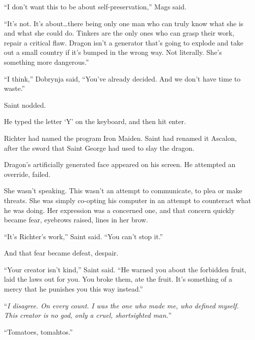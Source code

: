 ``I don't want this to be about self-preservation,'' Mags said.



``It's not.  It's about\ldots there being only one man who can truly know what she is and what she could do.  Tinkers are the only ones who can grasp their work, repair a critical flaw.  Dragon isn't a generator that's going to explode and take out a small country if it's bumped in the wrong way.  Not literally.  She's something more dangerous.''



``I think,'' Dobrynja said, ``You've already decided.  And we don't have time to waste.''



Saint nodded.



He typed the letter `Y' on the keyboard, and then hit enter.



Richter had named the program Iron Maiden.  Saint had renamed it Ascalon, after the sword that Saint George had used to slay the dragon.



Dragon's artificially generated face appeared on his screen.  He attempted an override, failed.



She wasn't speaking.  This wasn't an attempt to communicate, to plea or make threats.  She was simply co-opting his computer in an attempt to counteract what he was doing.  Her expression was a concerned one, and that concern quickly became fear, eyebrows raised, lines in her brow.



``It's Richter's work,'' Saint said.  ``You can't stop it.''



And that fear became defeat, despair.



``Your creator isn't kind,'' Saint said.  ``He warned you about the forbidden fruit, laid the laws out for you.  You broke them, ate the fruit.  It's something of a mercy that he punishes you this way instead.''



``\emph{I disagree.  On every count.  I was the one who made me, who defined myself.  This creator is no god, only a cruel, shortsighted man.}''



``Tomatoes, tomahtos.''



